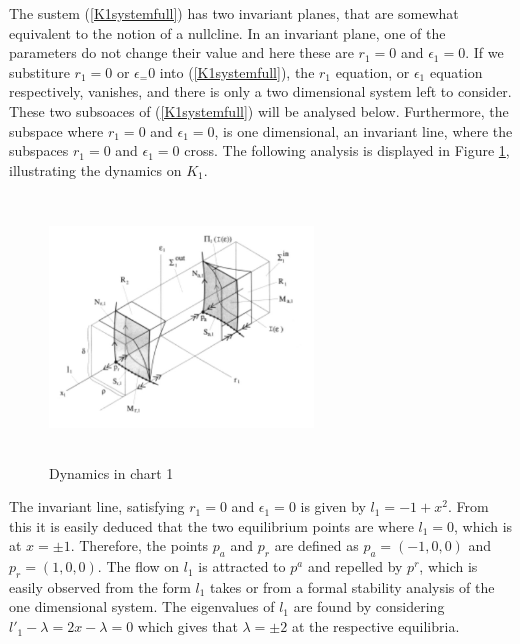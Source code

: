 The sustem (\ref{K1systemfull}) has two invariant planes, that are somewhat equivalent to the notion of a nullcline. In an invariant plane, one of the parameters do not change their value and here these are $r_1=0$ and $\epsilon_1=0$.
If we substiture $r_1=0$ or $\epsilon_ =0$ into (\ref{K1systemfull}), the $r_1$ equation, or $\epsilon_1$ equation respectively, vanishes, and there is only a two dimensional system left to consider.
These two subsoaces of (\ref{K1systemfull}) will be analysed below. Furthermore, the subspace where $r_1=0$ and $\epsilon_1=0$, is one dimensional, an invariant line, where the subspaces $r_1=0$ and $\epsilon_1=0$ cross.
The following analysis is displayed in Figure \ref{fig:k1chart}, illustrating the dynamics on $K_1$.
\begin{figure}[h!]
	\centering
	\includegraphics[height=7cm,width=7cm]{Images/K1Chart}
	\caption{Dynamics in chart 1 \citep{krupa2001}}
		\label{fig:k1chart}
\end{figure}\newpage


The invariant line, satisfying $r_1=0$ and $\epsilon_1=0$ is given by $l_1= -1 +x^2$. 
From this it is easily deduced that the two equilibrium points are where $l_1=0$, which is at $x=\pm1$. Therefore, the points $p_a$ and $p_r$ are defined as $p_a= (-1,0,0)$ and $p_r=(1,0,0)$.
The flow on $l_1$ is attracted to $p^a$ and repelled by $p^r$, which is easily observed from the form $l_1$ takes or from a formal stability analysis of the one dimensional system. The eigenvalues of $l_1$ are found  by considering $l'_1 - \lambda = 2x - \lambda= 0 $ which gives that $\lambda = \pm 2$ at the respective equilibria.
 
